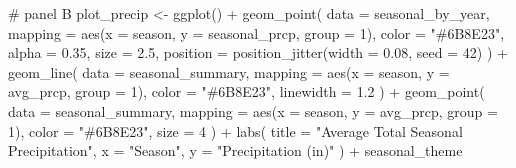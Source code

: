 \documentclass[
  letterpaper,
  DIV=11,
  numbers=noendperiod]{scrartcl}
\newenvironment{Shaded}{\begin{snugshade}}{\end{snugshade}}
\newcommand{\AttributeTok}[1]{\textcolor[rgb]{0.40,0.45,0.13}{#1}}
\newcommand{\CommentTok}[1]{\textcolor[rgb]{0.37,0.37,0.37}{#1}}
\newcommand{\DecValTok}[1]{\textcolor[rgb]{0.68,0.00,0.00}{#1}}
\newcommand{\FloatTok}[1]{\textcolor[rgb]{0.68,0.00,0.00}{#1}}
\newcommand{\FunctionTok}[1]{\textcolor[rgb]{0.28,0.35,0.67}{#1}}
\newcommand{\NormalTok}[1]{\textcolor[rgb]{0.00,0.23,0.31}{#1}}
\newcommand{\OtherTok}[1]{\textcolor[rgb]{0.00,0.23,0.31}{#1}}
\newcommand{\SpecialCharTok}[1]{\textcolor[rgb]{0.37,0.37,0.37}{#1}}
\newcommand{\StringTok}[1]{\textcolor[rgb]{0.13,0.47,0.30}{#1}}
\begin{document}
\begin{Shaded}
\begin{Highlighting}[]
\CommentTok{\# panel B}
\NormalTok{plot\_precip }\OtherTok{\textless{}{-}} \FunctionTok{ggplot}\NormalTok{() }\SpecialCharTok{+}
  \FunctionTok{geom\_point}\NormalTok{(}
    \AttributeTok{data     =}\NormalTok{ seasonal\_by\_year,}
    \AttributeTok{mapping  =} \FunctionTok{aes}\NormalTok{(}\AttributeTok{x =}\NormalTok{ season, }\AttributeTok{y =}\NormalTok{ seasonal\_prcp, }\AttributeTok{group =} \DecValTok{1}\NormalTok{),}
    \AttributeTok{color    =} \StringTok{"\#6B8E23"}\NormalTok{, }\AttributeTok{alpha =} \FloatTok{0.35}\NormalTok{, }\AttributeTok{size =} \FloatTok{2.5}\NormalTok{,}
    \AttributeTok{position =} \FunctionTok{position\_jitter}\NormalTok{(}\AttributeTok{width =} \FloatTok{0.08}\NormalTok{, }\AttributeTok{seed =} \DecValTok{42}\NormalTok{)}
\NormalTok{  ) }\SpecialCharTok{+}
  \FunctionTok{geom\_line}\NormalTok{(}
    \AttributeTok{data    =}\NormalTok{ seasonal\_summary,}
    \AttributeTok{mapping =} \FunctionTok{aes}\NormalTok{(}\AttributeTok{x =}\NormalTok{ season, }\AttributeTok{y =}\NormalTok{ avg\_prcp, }\AttributeTok{group =} \DecValTok{1}\NormalTok{),}
    \AttributeTok{color =} \StringTok{"\#6B8E23"}\NormalTok{, }\AttributeTok{linewidth =} \FloatTok{1.2}
\NormalTok{  ) }\SpecialCharTok{+}
  \FunctionTok{geom\_point}\NormalTok{(}
    \AttributeTok{data    =}\NormalTok{ seasonal\_summary,}
    \AttributeTok{mapping =} \FunctionTok{aes}\NormalTok{(}\AttributeTok{x =}\NormalTok{ season, }\AttributeTok{y =}\NormalTok{ avg\_prcp, }\AttributeTok{group =} \DecValTok{1}\NormalTok{),}
    \AttributeTok{color =} \StringTok{"\#6B8E23"}\NormalTok{, }\AttributeTok{size =} \DecValTok{4}
\NormalTok{  ) }\SpecialCharTok{+}
  \FunctionTok{labs}\NormalTok{(}
    \AttributeTok{title =} \StringTok{"Average Total Seasonal Precipitation"}\NormalTok{,}
    \AttributeTok{x     =} \StringTok{"Season"}\NormalTok{,}
    \AttributeTok{y     =} \StringTok{"Precipitation (in)"}
\NormalTok{  ) }\SpecialCharTok{+}
\NormalTok{  seasonal\_theme}


\end{Highlighting}
\end{Shaded}
\end{document}
